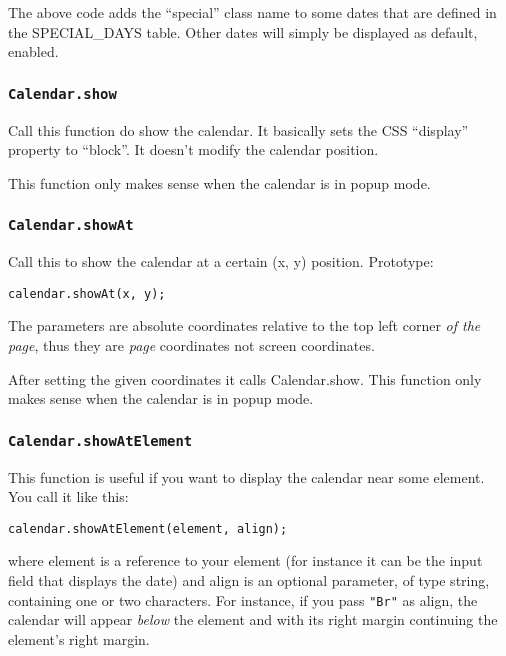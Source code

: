 \documentclass[a4paper,10pt]{article}
\begin{document}
The above code adds the ``special'' class name to some dates that are defined
in the SPECIAL\_DAYS table.  Other dates will simply be displayed as default,
enabled.

\subsubsection{\texttt{Calendar.show}}\label{sec:Calendar.show}

Call this function do show the calendar.  It basically sets the CSS ``display''
property to ``block''.  It doesn't modify the calendar position.

This function only makes sense when the calendar is in popup mode.

\subsubsection{\texttt{Calendar.showAt}}\label{sec:Calendar.showAt}

Call this to show the calendar at a certain (x, y) position.  Prototype:

\begin{verbatim}
calendar.showAt(x, y);
\end{verbatim}

\noindent The parameters are absolute coordinates relative to the top left
corner \emph{of the page}, thus they are \emph{page} coordinates not screen
coordinates.

After setting the given coordinates it calls Calendar.show.  This function only
makes sense when the calendar is in popup mode.

\subsubsection{\texttt{Calendar.showAtElement}}\label{sec:Calendar.showAtElement}

This function is useful if you want to display the calendar near some element.
You call it like this:

\begin{verbatim}
calendar.showAtElement(element, align);
\end{verbatim}

\noindent where element is a reference to your element (for instance it can be the input
field that displays the date) and align is an optional parameter, of type string,
containing one or two characters.  For instance, if you pass \texttt{"Br"} as
align, the calendar will appear \emph{below} the element and with its right
margin continuing the element's right margin.
\end{document}

